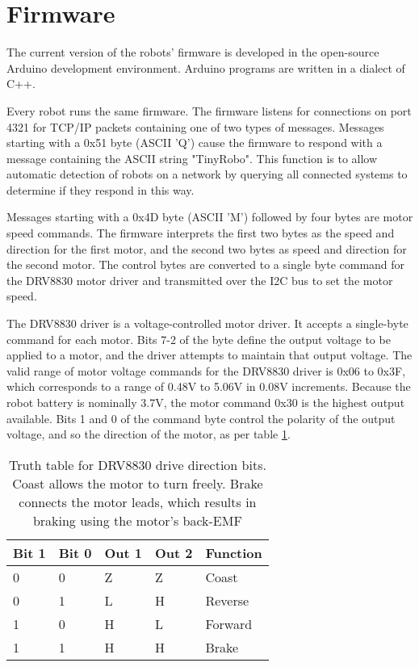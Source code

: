 \section {Firmware}

The current version of the robots' firmware is developed in the open-source Arduino development environment.
Arduino programs are written in a dialect of C++. 

Every robot runs the same firmware. 
The firmware listens for connections on port 4321 for TCP/IP packets containing one of two types of messages. 
Messages starting with a 0x51 byte (ASCII 'Q') cause the firmware to respond with a message containing the ASCII string "TinyRobo". 
This function is to allow automatic detection of robots on a network by querying all connected systems to determine if they respond in this way. 

Messages starting with a 0x4D byte (ASCII 'M') followed by four bytes are motor speed commands.
The firmware interprets the first two bytes as the speed and direction for the first motor, and the second two bytes as speed and direction for the second motor.
The control bytes are converted to a single byte command for the DRV8830 motor driver and transmitted over the I2C bus to set the motor speed.
 
The DRV8830 driver is a voltage-controlled motor driver. 
It accepts a single-byte command for each motor. 
Bits 7-2 of the byte define the output voltage to be applied to a motor, and the driver attempts to maintain that output voltage.
The valid range of motor voltage commands for the DRV8830 driver is 0x06 to 0x3F, which corresponds to a range of 0.48V to 5.06V in 0.08V increments. 
Because the robot battery is nominally 3.7V, the motor command 0x30 is the highest output available. 
Bits 1 and 0 of the command byte control the polarity of the output voltage, and so the direction of the motor, as per table \ref{tab:DRV8830_truth}.

\begin{table}
	\begin{tabular}{l l l l l}
	Bit 1 & Bit 0 & Out 1 & Out 2 & Function\\
	\hline
	0 & 0 & Z & Z & Coast\\
	0 & 1 & L & H & Reverse\\
	1 & 0 & H & L & Forward\\
	1 & 1 & H & H & Brake\\				
	\end{tabular}
	
	\caption{Truth table for DRV8830 drive direction bits. Coast allows the motor to turn freely. Brake connects the motor leads, which results in braking using the motor's back-EMF}
	\label{tab:DRV8830_truth}
\end{table}

